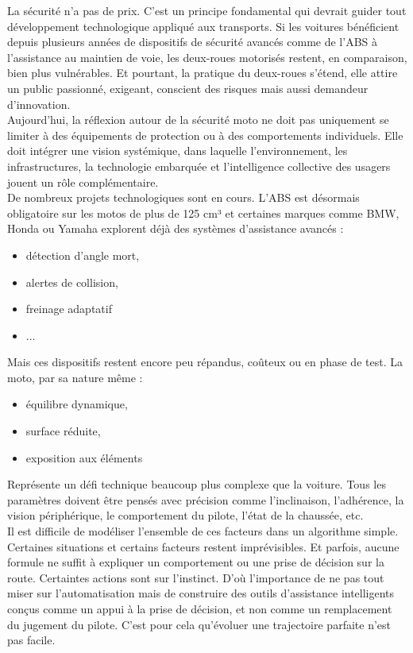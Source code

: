 La sécurité n’a pas de prix. C’est un principe fondamental qui devrait guider tout développement technologique appliqué aux transports. Si les voitures bénéficient depuis plusieurs années de dispositifs de sécurité avancés comme de l’ABS à l’assistance au maintien de voie, les deux-roues motorisés restent, en comparaison, bien plus vulnérables. Et pourtant, la pratique du deux-roues s’étend, elle attire un public passionné, exigeant, conscient des risques mais aussi demandeur d’innovation.\\
Aujourd’hui, la réflexion autour de la sécurité moto ne doit pas uniquement se limiter à des équipements de protection ou à des comportements individuels. Elle doit intégrer une vision systémique, dans laquelle l’environnement, les infrastructures, la technologie embarquée et l’intelligence collective des usagers jouent un rôle complémentaire.\\
De nombreux projets technologiques sont en cours. L’ABS est désormais obligatoire sur les motos de plus de 125 cm³ et certaines marques comme BMW, Honda ou Yamaha explorent déjà des systèmes d’assistance avancés : 
\begin{itemize}
	\item détection d’angle mort,
	\item alertes de collision,
	\item freinage adaptatif
	\item ...
\end{itemize}
Mais ces dispositifs restent encore peu répandus, coûteux ou en phase de test. La moto, par sa nature même :
\begin{itemize}
	\item équilibre dynamique,
	\item surface réduite,
	\item exposition aux éléments
\end{itemize}
Représente un défi technique beaucoup plus complexe que la voiture. Tous les paramètres doivent être pensés avec précision comme l'inclinaison, l'adhérence, la vision périphérique, le comportement du pilote, l'état de la chaussée, etc.\\
Il est difficile de modéliser l’ensemble de ces facteurs dans un algorithme simple. Certaines situations et certains facteurs restent imprévisibles. Et parfois, aucune formule ne suffit à expliquer un comportement ou une prise de décision sur la route. Certaintes actions sont sur l'instinct. D’où l’importance de ne pas tout miser sur l’automatisation mais de construire des outils d’assistance intelligents conçus comme un appui à la prise de décision, et non comme un remplacement du jugement du pilote. C'est pour cela qu'évoluer une trajectoire parfaite n'est pas facile.\\
